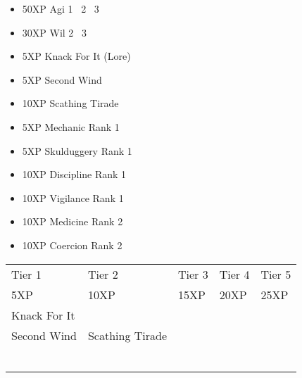 \documentclass{article}
\begin{document}


\begin{multicols}{2}
\setlength{\columnseprule}{0.3pt}
\begin{itemize}[noitemsep]
\item 50XP Agi 1 \faArrowRight\ 2 \faArrowRight\ 3
\item 30XP Wil 2 \faArrowRight\ 3
\item 5XP Knack For It (Lore)
\item 5XP Second Wind
\item 10XP Scathing Tirade
\item 5XP Mechanic Rank 1
\item 5XP Skulduggery Rank 1
\item 10XP Discipline Rank 1
\item 10XP Vigilance Rank 1
\item 10XP Medicine Rank 2
\item 10XP Coercion Rank 2
\end{itemize}
\end{multicols}


\vspace*{\fill}

\hfill{}


\pagebreak


\noindent\begin{tabu} to 
\rowfont{\bfseries\sffamily\centering} Tier 1 & Tier 2 & Tier 3 & Tier 4 & Tier 5\\
\rowfont{\small\sffamily\centering} 5XP & 10XP & 15XP & 20XP & 25XP\\
Knack For It\\
Second Wind & Scathing Tirade \\
 &  & \\
 &  & & \\
 &  & & & \\
 &  & & & \\
 &  & & & \\
 &  & & & \\

\end{tabu}
\end{document}
